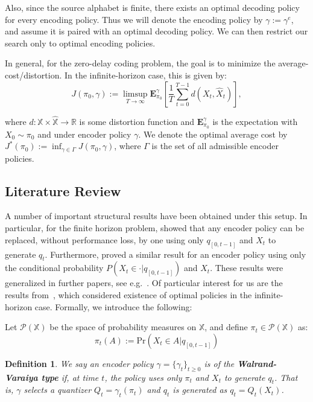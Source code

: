 \documentclass[conference, draftcls, onecolumn]{IEEEtran}
\newtheorem{definition}{Definition}
\begin{document}
Also, since the source alphabet is finite, there exists an optimal decoding policy for every encoding policy. Thus we will denote the encoding policy by \( \gamma := \gamma^e \), and assume it is paired with an optimal decoding policy. We can then restrict our search only to optimal encoding policies.

In general, for the zero-delay coding problem, the goal is to minimize the average-cost/distortion. In the infinite-horizon case, this is given by: %
\[ J(\pi_0, \gamma) := \limsup_{T\to\infty}\mathbf{E}_{\pi_0}^{\gamma}\left[\frac{1}{T}\sum_{t=0}^{T-1}d(X_t,\hat{X}_t)\right]\label{eq:average_cost}, \]

where \(d : \mathbb{X} \times \hat{\mathbb{X}} \to \mathbb{R}\) is some distortion function and \(\mathbf{E}_{\pi_0}^{\gamma}\) is the expectation with \(X_0 \sim \pi_0\) and under encoder policy \(\gamma\). We denote the optimal average cost by \(J^*(\pi_0) := \inf_{\gamma \in \Gamma}J(\pi_0,\gamma)\), where \(\Gamma\) is the set of all admissible encoder policies.

\subsection{Literature Review}
A number of important structural results have been obtained under this setup. In particular, for the finite horizon problem, \cite{Witsenhausen} showed that any encoder policy can be replaced, without performance loss, by one using only \(q_{[0,t-1]}\) and \(X_t\) to generate \(q_t\). Furthermore, \cite{Walrand} proved a similar result for an encoder policy using only the conditional probability \(P(X_t \in \cdot | q_{[0,t-1]})\) and \(X_t\). These results were generalized in further papers, see e.g.~\cite{Teneketzis, MahTen09, YukIT2010arXiv, Linder, Wood}. Of particular interest for us are the results from~\cite{Wood}, which considered existence of optimal policies in the infinite-horizon case. Formally, we introduce the following:

Let \(\mathcal{P}(\mathbb{X})\) be the space of probability measures on \(\mathbb{X}\), and define \(\pi_t \in \mathcal{P}(\mathbb{X})\) as:
\[\pi_t(A) := \text{Pr}(X_t \in A | q_{[0,t-1]})\]

\begin{definition}
    We say an encoder policy \(\gamma = \{\gamma_t\}_{t\ge0}\) is of the \textbf{Walrand-Varaiya type} if, at time \(t\), the policy uses only \(\pi_t\) and \(X_t\) to generate \(q_t\). That is, \(\gamma\) selects a quantizer \(Q_t = \gamma_t(\pi_t)\) and \(q_t\) is generated as \(q_t = Q_t(X_t)\).
\end{definition}
\end{document}
